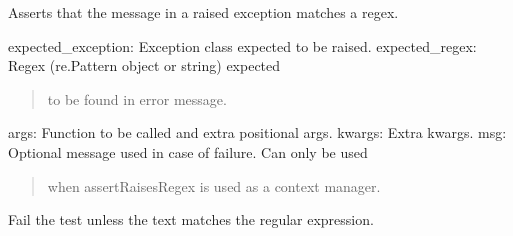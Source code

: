 \documentclass[letterpaper,10pt,english]{sphinxmanual}
\begin{document}
\begin{fulllineitems}
\begin{fulllineitems}
\end{fulllineitems}


\begin{fulllineitems}
\label{\detokenize{_autosummary/tests.test_unit.test_df:tests.test_unit.test_df.assertRaisesRegex}}
\pysigstartsignatures
{}
\pysigstopsignatures
\sphinxAtStartPar
Asserts that the message in a raised exception matches a regex.
\begin{description}
\sphinxAtStartPar
expected\_exception: Exception class expected to be raised.
expected\_regex: Regex (re.Pattern object or string) expected
\begin{quote}

\sphinxAtStartPar
to be found in error message.
\end{quote}

\sphinxAtStartPar
args: Function to be called and extra positional args.
kwargs: Extra kwargs.
msg: Optional message used in case of failure. Can only be used
\begin{quote}

\sphinxAtStartPar
when assertRaisesRegex is used as a context manager.
\end{quote}

\end{description}

\end{fulllineitems}


\begin{fulllineitems}
\label{\detokenize{_autosummary/tests.test_unit.test_df:tests.test_unit.test_df.assertRegex}}
\pysigstartsignatures
{}
\pysigstopsignatures
\sphinxAtStartPar
Fail the test unless the text matches the regular expression.

\end{fulllineitems}


\end{fulllineitems}
\end{document}
